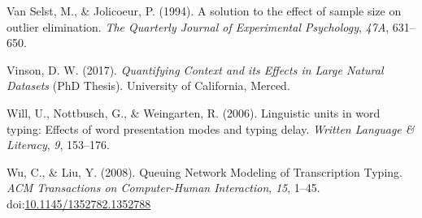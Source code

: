 \documentclass[,man,floatsintext]{apa6}
\begin{document}
\leavevmode\hypertarget{ref-van_selst_solution_1994}{}%
Van Selst, M., \& Jolicoeur, P. (1994). A solution to the effect of sample size on outlier elimination. \emph{The Quarterly Journal of Experimental Psychology}, \emph{47A}, 631--650.

\leavevmode\hypertarget{ref-vinson_quantifying_2017}{}%
Vinson, D. W. (2017). \emph{Quantifying Context and its Effects in Large Natural Datasets} (PhD Thesis). University of California, Merced.

\leavevmode\hypertarget{ref-will_linguistic_2006}{}%
Will, U., Nottbusch, G., \& Weingarten, R. (2006). Linguistic units in word typing: Effects of word presentation modes and typing delay. \emph{Written Language \& Literacy}, \emph{9}, 153--176.

\leavevmode\hypertarget{ref-wu_queuing_2008}{}%
Wu, C., \& Liu, Y. (2008). Queuing Network Modeling of Transcription Typing. \emph{ACM Transactions on Computer-Human Interaction}, \emph{15}, 1--45. doi:\href{https://doi.org/10.1145/1352782.1352788}{10.1145/1352782.1352788}

\endgroup
\end{document}
